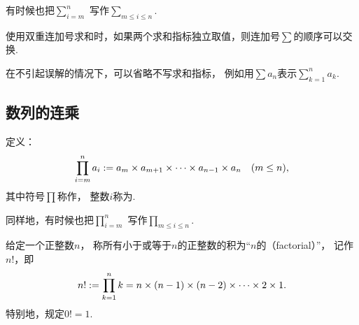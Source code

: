 \begin{figure}[htb]
	\centering
	\caption{}
\end{figure}

有时候也把\(\sum_{i=m}^n\)%
写作\(\sum_{m \leq i \leq n}\).

使用双重连加号求和时，如果两个求和指标独立取值，则连加号\(\sum\)的顺序可以交换.

在不引起误解的情况下，可以省略不写求和指标，
例如用\(\sum a_n\)表示\(\sum_{k=1}^n a_k\).

\subsection{数列的连乘}
\begin{definition}[连乘]
定义：\begin{equation*}
	\prod_{i=m}^n a_i
	:=
	a_m \times a_{m+1} \times \dotsb \times a_{n-1} \times a_n
	\quad(m \leq n),
\end{equation*}
其中符号\(\prod\)称作，
整数\(i\)称为.
\end{definition}

同样地，有时候也把\(\prod_{i=m}^n\)%
写作\(\prod_{m \leq i \leq n}\).

\begin{definition}\label{definition:数列.阶乘的定义}
给定一个正整数\(n\)，
称所有小于或等于\(n\)的正整数的积为“\(n\)的（factorial）”，
记作\(n!\)，即
\begin{equation}
	n!
	:=
	\prod_{k=1}^n k
	=
	n \times (n-1) \times (n-2) \times \dotsm \times 2 \times 1.
\end{equation}
特别地，规定\(0! = 1\).
\end{definition}

